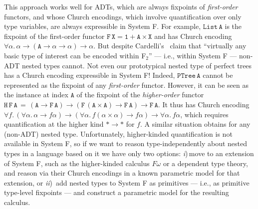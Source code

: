 \documentclass[runningheads]{llncs}
\begin{document}
This approach works well for ADTs, which are always fixpoints of {\em
  first-order} functors, and whose Church encodings, which involve
quantification over only type variables, are always expressible in
System F. For example, $\mathtt{List\,A}$ is the fixpoint of the
first-order functor $\mathtt{F\,X = 1 + A \times X}$ and has Church
encoding $\forall \alpha. \, \alpha \to (\mathtt{A} \to \alpha \to
\alpha) \to \alpha$. But despite Cardelli's~\cite{car97} claim that
``virtually any basic type of interest can be encoded within F$_2$''
--- i.e., within System F ---
non-ADT nested types cannot.
Not even our prototypical nested type of perfect trees has a Church
encoding expressible in System F!  Indeed, $\mathtt{PTree\,A}$ cannot
be represented as the fixpoint of any {\em first-order}
functor. However, it can be seen as the instance at index $\mathtt{A}$
of the fixpoint of the {\em higher-order} functor
$\mathtt{H\,F\,A\,=\, (A \to F\,A) \to (F \,(A \times A) \to F\,A) \to
  F\,A}$. It thus has Church encoding $\forall f.\, (\forall
\alpha.\,\alpha \to f\alpha) \to (\forall \alpha. \,f (\alpha \times
\alpha) \to f\alpha) \to \forall \alpha.\, f\alpha$, which requires
quantification at the higher kind $* \to *$ for $f$. A similar
situation obtains for any (non-ADT) nested type. Unfortunately,
higher-kinded quantification is not available in System F, so if we
want to reason type-independently about nested types in a language
based on it we have only two options: {\em i})\,move to an extension
of System F, such as the higher-kinded calculus $F\omega$ or a
dependent type theory, and reason via their Church encodings in a
known parametric model for that extension, or {\em ii})\, add nested
types to System F as primitives --- i.e., as primitive type-level
fixpoints --- and construct a parametric model for the resulting
calculus.
\end{document}
